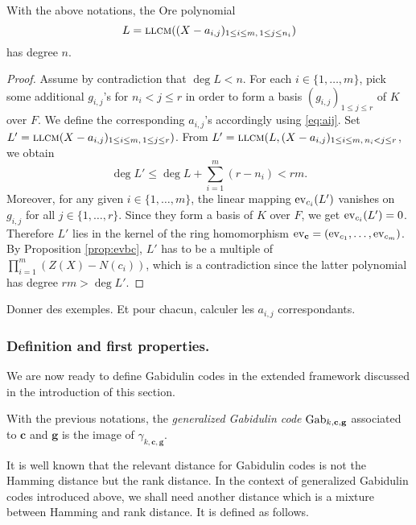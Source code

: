 \documentclass[a4paper]{llncs}
\def\todo#1{{\color{todo} #1}}
\newcommand{\ev}[1]{\textrm{\rm ev}_{#1}}
\newcommand{\llcm}{\textsc{llcm}}
\newcommand{\bc}{\textbf{c}}
\newcommand{\bg}{\textbf{g}}
\newcommand{\Gab}{\textrm{\rm Gab}}
\begin{document}
\begin{lemma}
\label{lem:llcmaij}
With the above notations, the Ore polynomial
$$L = \llcm((X - a_{i,j})_{1 \leq i \leq m,\,1 \leq j \leq n_i})$$
has degree $n$.
\end{lemma}

\begin{proof}
Assume by contradiction that $\deg L < n$.
For each $i \in \{1,\ldots,m\}$, pick some additional $g_{i,j}$'s
for $n_i < j \leq r$ in order to form a basis $(g_{i,j})_{1 \leq j 
\leq r}$ of $K$ over $F$. We define the corresponding $a_{i,j}$'s
accordingly using \eqref{eq:aij}. 
Set $L' = \llcm(X - a_{i,j})_{1 \leq i \leq m,\,1 \leq j \leq r})$.
From
$L' = \llcm(L, (X - a_{i,j})_{1 \leq i \leq m,\,n_i < j \leq r}$,
we obtain 
$$\deg L' \leq \deg L + \sum_{i=1}^m (r - n_i) < rm.$$
Moreover, for any given $i \in \{1,\ldots, m\}$, the linear mapping 
$\ev{c_i}(L')$ vanishes on $g_{i,j}$ for all $j \in \{1, \ldots,r\}$. 
Since they form a basis of $K$ over $F$, we get $\ev{c_i}(L') = 0$.
Therefore $L'$ lies in the kernel of the ring homomorphism $\ev\bc =
(\ev{c_1}, \ldots, \ev{c_m})$. By Proposition \ref{prop:evbc},
$L'$ has to be a multiple of $\prod_{i=1}^m (Z(X) - N(c_i))$,
which is a contradiction since the latter polynomial has degree $rm > 
\deg L'$.
\end{proof}

\todo{Donner des exemples. Et pour chacun, calculer les $a_{i,j}$
correspondants.}

\subsubsection*{Definition and first properties.}

We are now ready to define Gabidulin codes in the extended framework
discussed in the introduction of this section.

\begin{definition}%
With the previous notations, the \emph{generalized Gabidulin code} 
$\Gab_{k,\bc,\bg}$ associated to $\bc$ and $\bg$ is the image of 
$\gamma_{k,\bc,\bg}$.
\end{definition}

It is well known that the relevant distance for Gabidulin codes is 
not the Hamming distance but the rank distance. In the context of 
generalized Gabidulin codes introduced above, we shall need another
distance which is a mixture between Hamming and rank distance. It is
defined as follows.
\end{document}
